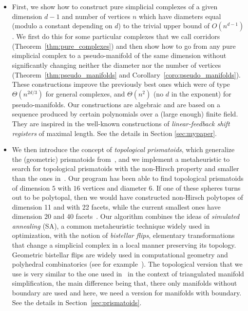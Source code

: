 \documentclass[12pt,a4paper]{article}
\theoremstyle{plain}
\theoremstyle{definition}
\begin{document}
\begin{itemize}
\item First, we show how to construct pure simplicial complexes of a given dimension $d-1$ and number of vertices $n$ which have diameters equal (modulo a constant depending on $d$) to the trivial upper bound of $O(n^{d-1})$. We first do this for some particular complexes that we call corridors 
(Theorem~\ref{thm:pure_complexes}) and then show how to go from any pure simplicial complex to a pseudo-manifold of the same dimension without significantly changing neither the diameter nor the number of vertices (Theorem~\ref{thm:pseudo_manifolds} and Corollary~\ref{coro:pseudo_manifolds}). These constructions improve the previously best ones which were of type $\Theta(n^{2d/3})$ for general complexes, and $\Theta(n^2)$ (no $d$ in the exponent) for pseudo-manifolds. Our constructions are algebraic and are based on a sequence produced by certain polynomials over a (large enough) finite field. They are inspired in the well-known constructions of \emph{linear-feedback shift registers} of maximal length. See the details in Section \ref{sec:mypaper}.

\item We then introduce the concept of \emph{topological prismatoids}, which generalize the (geometric) prismatoids from~\cite{counterexample,improvement}, and we implement a metaheuristic to search for topological prismatoids with the non-Hirsch property and smaller than the ones in~\cite{counterexample,improvement}. Our program has been able to find topological prismatoids of dimension $5$ with $16$ vertices and diameter $6$. If one of these spheres turns out to be polytopal, then we would have constructed non-Hirsch polytopes of dimension 11 and with 22 facets, while the current smallest ones have dimension 20 and 40 facets~\cite{improvement}. Our algorithm combines the ideas of  \emph{simulated annealing} (SA), a common metaheuristic technique widely used in optimization, with the notion of \emph{bistellar flips}, elementary transformations that change a simplicial complex in a local manner preserving its topology. Geometric bistellar flips are widely used in computational geometry and polyhedral combinatorics (see for example~\cite{SantosFlips}). The topological version that we use is very similar to the one used in~\cite{Lutz} in the context of triangulated manifold simplification, the main difference being that,  there only manifolds without boundary are used and here, we need a version for manifolds with boundary. See the details in Section~\ref{sec:prismatoids}.
\end{itemize}
\end{document}
